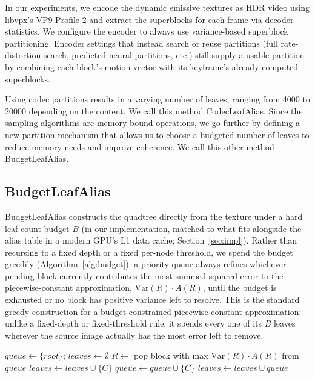 \documentclass[acmtog,review]{acmart}
\begin{document}
In our experiments, we encode the dynamic emissive textures as HDR video using libvpx's VP9 Profile 2 and extract the superblocks for each frame via decoder statistics. We configure the encoder to always use variance-based superblock partitioning. Encoder settings that instead search or reuse partitions (full rate-distortion search, predicted neural partitions, etc.)  still supply a usable partition by combining each block's motion vector with its keyframe's already-computed superblocks.  

Using codec partitions results in a varying number of leaves, ranging from 4000 to 20000 depending on the content. We call this method CodecLeafAlias. Since the sampling algorithms are memory-bound operations, we go further by defining a new partition mechanism that allows us to choose a budgeted number of leaves to reduce memory needs and improve coherence. We call this other method BudgetLeafAlias.

\subsection{BudgetLeafAlias}
\label{sec:budget}
BudgetLeafAlias constructs the quadtree directly from the texture under a hard
leaf-count budget $B$ (in our implementation, matched to what fits alongside the alias
table in a modern GPU's L1 data cache; Section~\ref{sec:impl}). Rather than recursing to a
fixed depth or a fixed per-node threshold, we spend the budget greedily
(Algorithm~\ref{alg:budget}): a priority queue always refines whichever pending block
currently contributes the most summed-squared error to the piecewise-constant
approximation, $\mathrm{Var}(R)\cdot A(R)$, until the budget is exhausted or no block has
positive variance left to resolve. This is the standard greedy construction for a
budget-constrained piecewise-constant approximation: unlike a fixed-depth or
fixed-threshold rule, it spends every one of its $B$ leaves wherever the source image
actually has the most error left to remove.

\begin{algorithm}[h]
\caption{Build a budgeted quadtree of $\leq B$ leaves}
\label{alg:budget}
\begin{algorithmic}[1]
\STATE $\mathit{queue} \leftarrow \{\mathit{root}\}$; \quad $\mathit{leaves} \leftarrow \emptyset$
  \STATE $R \leftarrow$ pop block with max $\mathrm{Var}(R)\cdot A(R)$ from $\mathit{queue}$
      \STATE $\mathit{leaves} \leftarrow \mathit{leaves} \cup \{C\}$
    \ELSE
      \STATE $\mathit{queue} \leftarrow \mathit{queue} \cup \{C\}$
    \ENDIF
  \ENDFOR
\ENDWHILE
\STATE $\mathit{leaves} \leftarrow \mathit{leaves} \cup \mathit{queue}$
\end{algorithmic}
\end{algorithm}
\end{document}
